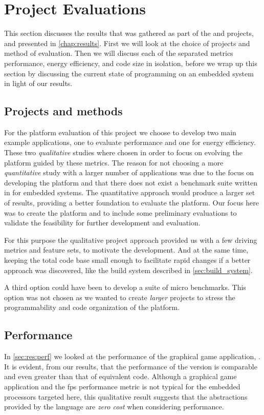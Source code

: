 
\section{Project Evaluations}
\label{sec:disc:project_evaluations}

This section discusses the results that was gathered as part of the {\tracker} and {\cg} projects, and presented in \autoref{chap:results}.
First we will look at the choice of projects and method of evaluation.
Then we will discuss each of the separated metrics performance, energy efficiency, and code size in isolation, before we wrap up this section by discussing the current state of {\rust} programming on an embedded system in light of our results.

\subsection{Projects and methods}

For the platform evaluation of this project we choose to develop two main example applications, one to evaluate performance and one for energy efficiency.
These two \emph{qualitative} studies where chosen in order to focus on evolving the platform guided by these metrics.
The reason for not choosing a more \emph{quantitative} study with a larger number of applications was due to the focus on developing the platform and that there does not exist a benchmark suite written in {\rust} for embedded systems.
The quantitative approach would produce a larger set of results, providing a better foundation to evaluate the platform.
Our focus here was to create the platform and to include some preliminary evaluations to validate the feasibility for further development and evaluation.

For this purpose the qualitative project approach provided us with a few driving metrics and feature sets, to motivate the development.
And at the same time, keeping the total code base small enough to facilitate rapid changes if a better approach was discovered, like the build system described in \autoref{sec:build_system}.

A third option could have been to develop a suite of micro benchmarks.
This option was not chosen as we wanted to create \emph{larger} projects to stress the programmability and code organization of the platform.

\subsection{Performance}
In \autoref{sec:res:perf} we looked at the performance of the graphical game application, {\cg}.
It is evident, from our results, that the performance of the {\rust} version is comparable and even greater than that of equivalent {\C} code.
Although a graphical game application and the \gls{fps} performance metric is not typical for the embedded processors targeted here, this qualitative result suggests that the abstractions provided by the {\rust} language are \emph{zero cost} when considering performance.

